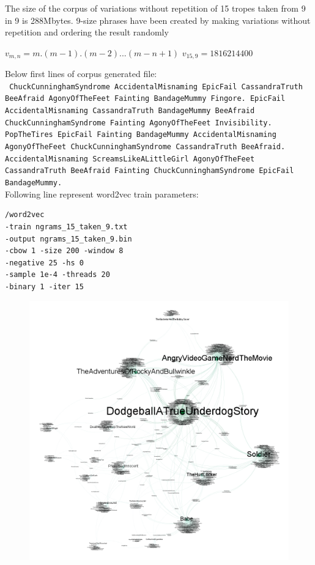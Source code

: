\documentclass[letterpaper]{article}
\begin{document}
    The size of the corpus of variations without repetition of 15 tropes taken from 9 in 9 is 288Mbytes. 9-size phrases have been created by making variations without repetition and ordering the result randomly \\  
	
	\begin{center}

${v}_{m,n} = m.(m-1).(m-2)...(m-n+1)$
${v}_{15,9} = 1816214400$
	
    \end{center}
	
	Below first lines of corpus generated file:\\
	\texttt{    
	ChuckCunninghamSyndrome AccidentalMisnaming EpicFail CassandraTruth BeeAfraid AgonyOfTheFeet Fainting BandageMummy Fingore. EpicFail AccidentalMisnaming CassandraTruth BandageMummy BeeAfraid ChuckCunninghamSyndrome Fainting AgonyOfTheFeet Invisibility. PopTheTires EpicFail Fainting BandageMummy AccidentalMisnaming AgonyOfTheFeet ChuckCunninghamSyndrome CassandraTruth BeeAfraid. AccidentalMisnaming ScreamsLikeALittleGirl AgonyOfTheFeet CassandraTruth BeeAfraid Fainting ChuckCunninghamSyndrome EpicFail BandageMummy.}\\

    Following line represent word2vec train parameters:\\
\begin{verbatim}
/word2vec 
-train ngrams_15_taken_9.txt 
-output ngrams_15_taken_9.bin 
-cbow 1 -size 200 -window 8 
-negative 25 -hs 0 
-sample 1e-4 -threads 20 
-binary 1 -iter 15
\end{verbatim}
	
	\begin{figure}
		\centering
		\includegraphics[width=0.9\linewidth]{../data/gephi/pairs_films-trope_1k_v3}
		\caption{}
		\label{fig:pairsfilms-trope1kv3}
	\end{figure}
\end{document}
